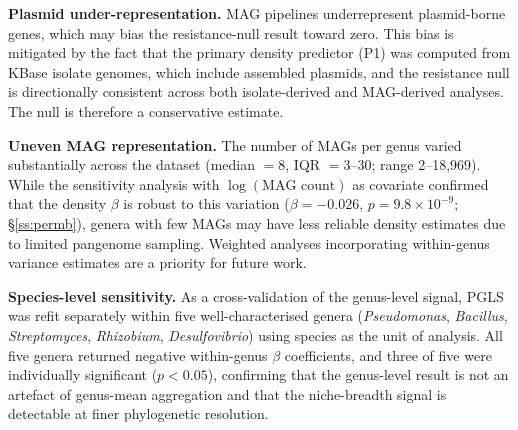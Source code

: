 \documentclass[times]{zHenriquesLab-StyleBioRxiv}
\begin{document}
\textbf{Plasmid under-representation.} MAG pipelines underrepresent
plasmid-borne genes, which may bias the resistance-null result toward zero.
This bias is mitigated by the fact that the primary density predictor (P1) was
computed from KBase isolate genomes, which include assembled plasmids, and the
resistance null is directionally consistent across both isolate-derived and
MAG-derived analyses. The null is therefore a conservative estimate.

\textbf{Uneven MAG representation.} The number of MAGs per genus varied
substantially across the dataset (median $= 8$, IQR $= 3$--30; range
2--18{,}969). While the sensitivity analysis with $\log(\text{MAG count})$ as
covariate confirmed that the density $\beta$ is robust to this variation
($\beta = -0.026$, $p = 9.8 \times 10^{-9}$; \S\ref{ss:permb}), genera with few
MAGs may have less reliable density estimates due to limited pangenome sampling.
Weighted analyses incorporating within-genus variance estimates are a priority
for future work.

\textbf{Species-level sensitivity.} As a cross-validation of the genus-level
signal, PGLS was refit separately within five well-characterised genera
(\textit{Pseudomonas}, \textit{Bacillus}, \textit{Streptomyces},
\textit{Rhizobium}, \textit{Desulfovibrio}) using species as the unit of
analysis. All five genera returned negative within-genus $\beta$ coefficients, and
three of five were individually significant ($p < 0.05$), confirming that
the genus-level result is not an artefact of genus-mean aggregation and that
the niche-breadth signal is detectable at finer phylogenetic resolution.
\end{document}
